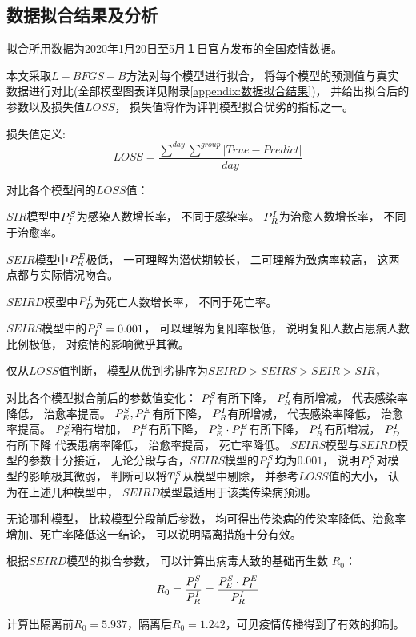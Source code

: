 \subsection{数据拟合结果及分析}
\par 拟合所用数据为2020年1月20日至5月１日官方发布的全国疫情数据。
\par 本文采取$L-BFGS-B$方法对每个模型进行拟合，
将每个模型的预测值与真实数据进行对比(全部模型图表详见附录\ref{appendix:数据拟合结果})，
并给出拟合后的参数以及损失值$LOSS$，
损失值将作为评判模型拟合优劣的指标之一。
\par 损失值定义:
\begin{equation}
    LOSS = \frac{\sum\limits^{day}\sum\limits^{group}
        \left|True-Predict\right|}{day}
\end{equation}
\par 对比各个模型间的$LOSS$值：
\par $SIR$模型中$\P{S}{I}$为感染人数增长率，
不同于感染率。
$\P{I}{R}$为治愈人数增长率，
不同于治愈率。
\par $SEIR$模型中$\P{E}{R}$极低，
一可理解为潜伏期较长，
二可理解为致病率较高，
这两点都与实际情况吻合。
\par $SEIRD$模型中$\P{I}{D}$为死亡人数增长率，
不同于死亡率。
\par $SEIRS$模型中的$\P{R}{I}=0.001$，
可以理解为复阳率极低，
说明复阳人数占患病人数比例极低，
对疫情的影响微乎其微。
\par 仅从$LOSS$值判断，
模型从优到劣排序为$SEIRD>SEIRS>SEIR>SIR$，
\par 对比各个模型拟合前后的参数值变化：
$\P{S}{I}$有所下降，
$\P{I}{R}$有所增减，
代表感染率降低，
治愈率提高。
$\P{S}{E},\P{E}{I}$有所下降，
$\P{I}{R}$有所增减，
代表感染率降低，
治愈率提高。
$\P{S}{E}$稍有增加，
$\P{E}{I}$有所下降，
$\P{S}{E}\cdot \P{E}{I}$有所下降，
$\P{I}{R}$有所增减，
$\P{I}{D}$有所下降
代表患病率降低，
治愈率提高，
死亡率降低。
$SEIRS$模型与$SEIRD$模型的参数十分接近，
无论分段与否，$SEIRS$模型的$\P{S}{I}$均为$0.001$，
说明$\P{S}{I}$对模型的影响极其微弱，
判断可以将$\T{S}{I}$从模型中剔除，
并参考$LOSS$值的大小，
认为在上述几种模型中，
$SEIRD$模型最适用于该类传染病预测。
\par 无论哪种模型，
比较模型分段前后参数，
均可得出传染病的传染率降低、治愈率增加、死亡率降低这一结论，
可以说明隔离措施十分有效。
\par 根据$SEIRD$模型的拟合参数，
可以计算出病毒大致的基础再生数
$R_0$\cite{应用SEIR模型预测2009年甲型H1N1流感流行趋势,王宝童2013流感传播数学模型的基本再生数}：
\begin{equation}
    R_0 = \frac{\P{S}{I}}{\P{I}{R}}
    = \frac{\P{S}{E}\cdot \P{E}{I}}{\P{I}{R}}
\end{equation}
\par 计算出隔离前$R_0=5.937$，隔离后$R_0=1.242$，可见疫情传播得到了有效的抑制。